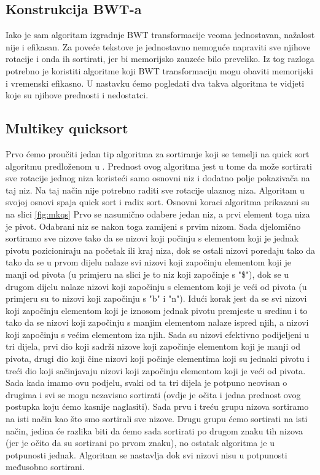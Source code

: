\subsection{Konstrukcija BWT-a}
Iako je sam algoritam izgradnje BWT transformacije veoma jednostavan, nažalost nije i efikasan. Za poveće tekstove je jednostavno nemoguće napraviti sve njihove rotacije i onda ih sortirati, jer bi memorijsko zauzeće bilo preveliko. Iz tog razloga potrebno je koristiti algoritme koji BWT transformaciju mogu obaviti memorijski i vremenski efikasno. U nastavku ćemo pogledati dva takva algoritma te vidjeti koje su njihove prednosti i nedostatci.

\subsection{Multikey quicksort}
Prvo ćemo proučiti jedan tip algoritma za sortiranje koji se temelji na quick sort algoritmu predloženom u \cite{mkqs}. Prednost ovog algoritma jest u tome da može sortirati sve rotacije jednog niza koristeći samo osnovni niz i dodatno polje pokazivača na taj niz. Na taj način nije potrebno raditi sve rotacije ulaznog niza. Algoritam u svojoj osnovi spaja quick sort i radix sort. Osnovni koraci algoritma prikazani su na slici \ref{fig:mkqs}  Prvo se nasumično odabere jedan niz, a prvi element toga niza je pivot. Odabrani niz se nakon toga zamijeni s prvim nizom. Sada djelomično sortiramo sve nizove tako da se nizovi koji počinju s elementom koji je jednak pivotu pozicioniraju na početak ili kraj niza, dok se ostali nizovi poredaju tako da tako da se u prvom dijelu nalaze svi nizovi koji započinju elementom koji je manji od pivota (u primjeru na slici je to niz koji započinje s "\$"), dok se u drugom dijelu nalaze nizovi koji započinju s elementom koji je veći od pivota (u primjeru su to nizovi koji započinju s "b" i "n"). Idući korak jest da se svi nizovi koji započinju elementom koji je iznosom jednak pivotu premjeste u sredinu i to tako da se nizovi koji započinju s manjim elementom nalaze ispred njih, a nizovi koji započinju s većim elementom iza njih.  Sada su nizovi efektivno podijeljeni u tri dijela, prvi dio koji sadrži nizove koji započinje elementom koji je manji od pivota, drugi dio koji čine nizovi koji počinje elementima koji su jednaki pivotu i treći dio koji sačinjavaju nizovi  koji započinju elementom koji je veći od pivota. Sada kada imamo ovu podjelu, svaki od ta tri dijela je potpuno neovisan o drugima i svi se mogu nezavisno sortirati (ovdje je očita i jedna prednost ovog postupka koju ćemo kasnije naglasiti). Sada prvu i treću grupu nizova sortiramo na isti način kao što smo sortirali sve nizove. Drugu grupu ćemo sortirati na isti način, jedina će razlika biti da ćemo sada sortirati po drugom znaku tih nizova (jer je očito da su sortirani po prvom znaku), no ostatak algoritma je u potpunosti jednak. Algoritam se nastavlja dok svi nizovi nisu u potpunosti međusobno sortirani.



